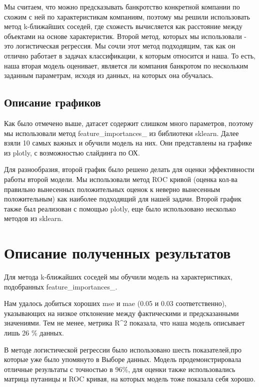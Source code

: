 \documentclass{article}
\begin{document}
Мы считаем, что можно предсказывать банкротство конкретной компании по схожим с ней по характеристикам компаниям, поэтому мы решили использовать метод k-ближайших соседей, где схожесть вычисляется как расстояние между объектами на основе характеристик. Второй метод, которых мы использовали - это логистическая регрессия. Мы сочли этот метод подходящим, так как он отлично работает в задачах классификации, к которым относится и наша. То есть, наша вторая модель оценивает, является ли компания банкротом по нескольким заданным параметрам, исходя из данных, на которых она обучалась.



\subsection{Описание графиков}

Как было отмечено выше, датасет содержит слишком много параметров, поэтому мы использовали метод feature\_importances\_ из библиотеки sklearn. Далее взяли 10 самых важных и обучили модель на них. Они представлены на графике из plotly, с возможностью слайдинга по ОХ.

Для разнообразия, второй график было решено делать для оценки эффективности работы второй модели. Мы использовали метод ROC кривой (оценка кол-ва правильно вынесенных положительных оценок к неверно вынесенным положительным) как наиболее подходящий для нашей задачи. Второй график также был реализован с помощью plotly, еще было использовано несколько методов из sklearn.

\section{Описание полученных результатов}

Для метода k-ближайших соседей мы обучили модель на характеристиках, подобранных feature\_importances\_.

Нам удалось добиться хороших mse и mae (0.05 и 0.03 соответственно), указывающих на низкое отклонение между фактическими и предсказанными значениями.
Тем не менее, метрика {R^2} показала, что наша модель описывает лишь 26 \%  данных.

В методе логистической регрессии было использовано шесть показателей,про которые уже было упомянуто в Выборе данных. Модель продемонстрировала отличные результаты с точностью в 96\%, для оценки также использовались матрица путаницы и ROC кривая, на которых модель тоже показала себя хорошо. 
\end{document}
